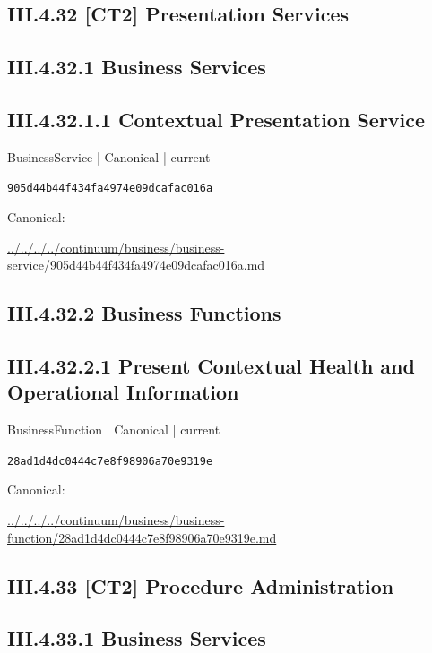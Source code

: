 \documentclass[10pt,a4paper]{article}
\begin{document}
\subsection*{III.4.32 [CT2] Presentation Services}
\subsection*{III.4.32.1 Business Services}
\subsection*{III.4.32.1.1 Contextual Presentation Service}
{\small BusinessService | Canonical | current}\par
\texttt{905d44b44f434fa4974e09dcafac016a}\par
Canonical: \par
{\footnotesize\url{../../../../continuum/business/business-service/905d44b44f434fa4974e09dcafac016a.md}}\par
\subsection*{III.4.32.2 Business Functions}
\subsection*{III.4.32.2.1 Present Contextual Health and Operational Information}
{\small BusinessFunction | Canonical | current}\par
\texttt{28ad1d4dc0444c7e8f98906a70e9319e}\par
Canonical: \par
{\footnotesize\url{../../../../continuum/business/business-function/28ad1d4dc0444c7e8f98906a70e9319e.md}}\par
\subsection*{III.4.33 [CT2] Procedure Administration}
\subsection*{III.4.33.1 Business Services}
\end{document}
